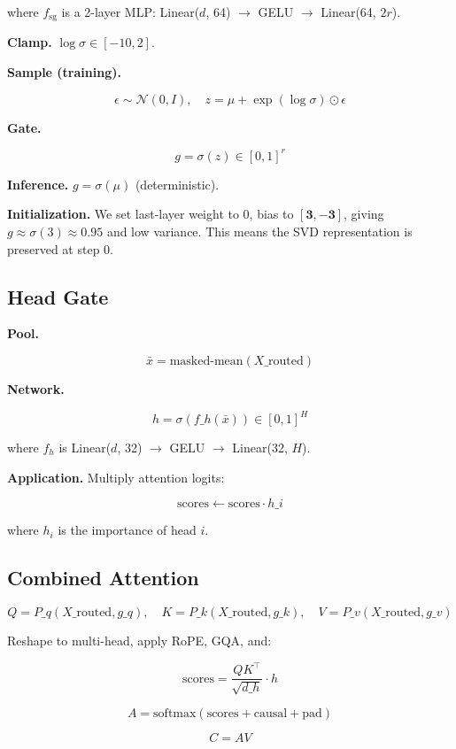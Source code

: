 where $f_\text{sg}$ is a 2-layer MLP: Linear($d$, 64) $\to$ GELU $\to$ Linear(64, $2r$).

\textbf{Clamp.} $\log \sigma \in [-10, 2]$.

\textbf{Sample (training).}

\[
\epsilon \sim \mathcal{N}(0, I), \quad z = \mu + \exp(\log \sigma) \odot \epsilon
\tag{4.9}
\]

\textbf{Gate.}

\[
g = \sigma(z) \in [0, 1]^r
\tag{4.10}
\]

\textbf{Inference.} $g = \sigma(\mu)$ (deterministic).

\textbf{Initialization.} We set last-layer weight to 0, bias to $[\mathbf{3}, \mathbf{-3}]$, 
giving $g \approx \sigma(3) \approx 0.95$ and low variance. This means the 
SVD representation is preserved at step 0.

\subsection{Head Gate}

\textbf{Pool.}

\[
\bar{x} = \text{masked-mean}(X\_\text{routed})
\tag{4.11}
\]

\textbf{Network.}

\[
h = \sigma(f\_h(\bar{x})) \in [0, 1]^H
\tag{4.12}
\]

where $f_h$ is Linear($d$, 32) $\to$ GELU $\to$ Linear(32, $H$).

\textbf{Application.} Multiply attention logits:

\[
\text{scores} \leftarrow \text{scores} \cdot h\_i
\tag{4.13}
\]

where $h_i$ is the importance of head $i$.

\subsection{Combined Attention}

\[
Q = P\_q(X\_\text{routed}, g\_q), \quad K = P\_k(X\_\text{routed}, g\_k), \quad V = P\_v(X\_\text{routed}, g\_v)
\tag{4.14}
\]

Reshape to multi-head, apply RoPE, GQA, and:

\[
\text{scores} = \frac{Q K^\top}{\sqrt{d\_h}} \cdot h
\tag{4.15}
\]

\[
A = \text{softmax}(\text{scores} + \text{causal} + \text{pad})
\tag{4.16}
\]

\[
C = A V
\tag{4.17}
\]

